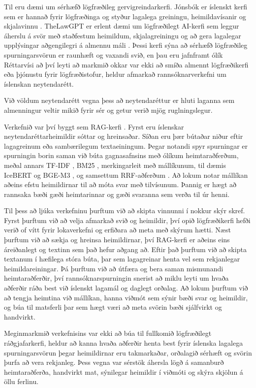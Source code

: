 \documentclass[fleqn]{report}
\begin{document}
Til eru dæmi um sérhæfð lögfræðileg gervigreindarkerfi. Jónsbók er íslenskt kerfi sem er hannað fyrir lögfræðinga og styður lagalega greiningu, heimildavísanir og skjalavinnu \cite{jonsbok}. TheLawGPT er erlent dæmi um lögfræðilegt AI-kerfi sem leggur áherslu á svör með staðfestum heimildum, skjalagreiningu og að gera lagalegar upplýsingar aðgengilegri á almennu máli \cite{thelawgpt}. Þessi kerfi sýna að sérhæfð lögfræðileg spurningarsvörun er raunhæft og vaxandi svið, en þau eru jafnframt ólík Réttarvísi að því leyti að markmið okkar var ekki að smíða almennt lögfræðikerfi eða þjónustu fyrir lögfræðistofur, heldur afmarkað rannsóknarverkefni um íslenskan neytendarétt.

Við völdum neytendarétt vegna þess að neytendaréttur er hluti laganna sem almenningur veltir mikið fyrir sér og getur verið mjög ruglningslegur.

Verkefnið var því byggt sem RAG-kerfi \cite{rag}. Fyrst eru íslenskar neytendaréttarheimildir sóttar og hreinsaðar. Síðan eru þær bútaðar niður eftir lagagreinum eða sambærilegum textaeiningum. Þegar notandi spyr spurningar er spurningin borin saman við búta gagnasafnsins með ólíkum heimtaraðferðum, meðal annars TF-IDF \cite{course-slides}, BM25 \cite{bm25}, merkingarleit með mállíkunum, til dæmis IceBERT \cite{icebert} og BGE-M3 \cite{bge-m3}, og samsettum RRF-aðferðum \cite{rrf}. Að lokum notar mállíkan aðeins efstu heimildirnar til að móta svar með tilvísunum. Þannig er hægt að rannsaka bæði gæði heimtarinnar og gæði svaranna sem verða til úr henni.

Til þess að ljúka verkefninu þurftum við að skipta vinnunni í nokkur skýr skref. Fyrst þurftum við að velja afmarkað svið og heimildir, því opið lögfræðikerfi hefði verið of vítt fyrir lokaverkefni og erfiðara að meta með skýrum hætti. Næst þurftum við að sækja og hreinsa heimildirnar, því RAG-kerfi er aðeins eins áreiðanlegt og textinn sem það hefur aðgang að. Eftir það þurftum við að skipta textanum í hæfilega stóra búta, þar sem lagagreinar henta vel sem rekjanlegar heimildareiningar. Þá þurftum við að útfæra og bera saman mismunandi heimtaraðferðir, því rannsóknarspurningin snerist að miklu leyti um hvaða aðferðir ráða best við íslenskt lagamál og daglegt orðalag. Að lokum þurftum við að tengja heimtina við mállíkan, hanna viðmót sem sýnir bæði svar og heimildir, og búa til matsferli þar sem hægt væri að meta svörin bæði sjálfvirkt og handvirkt.

Meginmarkmið verkefnisins var ekki að búa til fullkomið lögfræðilegt ráðgjafarkerfi, heldur að kanna hvaða aðferðir henta best fyrir íslenska lagalega spurningarsvörun þegar heimildirnar eru takmarkaðar, orðalagið sérhæft og svörin þurfa að vera rekjanleg. Þess vegna var sérstök áhersla lögð á samanburð heimtaraðferða, handvirkt mat, sýnilegar heimildir í viðmóti og skýra skjölun á öllu ferlinu.
\end{document}
